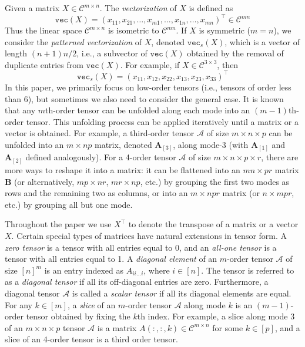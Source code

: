 \documentclass[11pt, oneside]{article}  %
\newcommand{\vecc}{\texttt{vec}}
\newcommand{\A}{\mathcal{A}}
\newcommand{\C}{\mathcal{C}}
\begin{document}
Given a matrix $X\in\C^{m\times n}$.  The \emph{vectorization} of $X$ is defined as 
\[
\vecc(X)=(x_{11},x_{21},\ldots,x_{m1},\ldots, x_{1n},\ldots,x_{mn})^{\top}\in\C^{mn}
\]
Thus the linear space $\C^{m\times n}$ is isometric to $\C^{mn}$.  If $X$ is symmetric ($m=n$), we consider the \emph{patterned vectorization}
of $X$, denoted $\vecc_{s}(X)$, which is a vector of length $(n+1)n/2$, i.e., a subvector of $\vecc(X)$ obtained by the removal of duplicate entries from 
$\vecc(X)$.  For example, if  $X\in\C^{3\times 3}$, then   
\[
\vecc_{s}(X)= (x_{11},x_{12},x_{22},x_{13},x_{23},x_{33})^{\top}
\]
In this paper, we primarily focus on low-order tensors (i.e., tensors of order less than 6), but sometimes we also need to consider the general case.  
It is known that any $m$th-order tensor can be unfolded along each mode into an $(m-1)$th-order tensor. This unfolding process can be applied 
iteratively until a matrix or a vector is obtained. For example, a third-order tensor $\A$ 
of size $m \times n \times p$ can be unfolded into an $m \times np$ matrix, denoted $\mathbf{A}_{[3]}$, along mode-3 (with $\mathbf{A}_{[1]}$ and $
\mathbf{A}_{[2]}$ defined analogously). For a 4-order tensor $\A$ of size $m \times n \times p \times r$, there are more ways to reshape it into a matrix: it 
can be flattened into an $mn \times pr$ matrix $\mathbf{B}$ (or alternatively, $mp \times nr$, $mr \times np$, etc.) by grouping the first two modes as rows 
and the remaining two as columns, or into an $m \times npr$ matrix (or $n \times mpr$, etc.) by grouping all but one mode. 

Throughout the paper we use $X^{\top}$ to denote the transpose of a matrix or a vector $X$. Certain special types of matrices have natural extensions in 
tensor form. A \emph{zero tensor} is a tensor with all entries equal to 0, and an \emph{all-one tensor} is a tensor with all entries equal to 1. A \emph{diagonal element} of an $m$-order tensor $\A$ of size $[n]^{m}$ is an entry indexed as 
$A_{ii\ldots i}$, where $i\in [n]$. The tensor is referred to as a \emph{diagonal tensor} if all its off-diagonal entries are zero. Furthermore, a diagonal tensor 
$\A$ is called a \emph{scalar tensor} if all its diagonal elements are equal. For any $k\in [m]$, a \emph{slice} of an $m$-order tensor $\A$ along mode $k$ is 
an $(m-1)$-order tensor obtained by fixing the $k$th index. For example, a slice along mode 3 of an $m \times n \times p$ tensor $\A$ is a matrix 
$A(:,:,k)\in \C^{m \times n}$ for some $k \in [p]$, and a slice of an 4-order tensor is a third order tensor.
\end{document}
